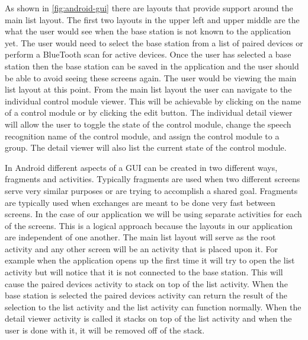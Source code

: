 As shown in \autoref{fig:android-gui} there are layouts that provide support
around the main list layout. The first two layouts in the upper left and upper
middle are the what the user would see when the base station is not known to
the application yet. The user would need to select the base station from a list
of paired devices or perform a BlueTooth scan for active devices. Once the user
has selected a base station then the base station can be saved in the
application and the user should be able to avoid seeing these screens again.
The user would be viewing the main list layout at this point. From the main
list layout the user can navigate to the individual control module viewer. This
will be achievable by clicking on the name of a control module or by clicking
the edit button. The individual detail viewer will allow the user to toggle the
state of the control module, change the speech recognition name of the control
module, and assign the control module to a group. The detail viewer will also
list the current state of the control module.

In Android different aspects of a GUI can be created in two different ways,
fragments and activities. Typically fragments are used when two different
screens serve very similar purposes or are trying to accomplish a shared goal.
Fragments are typically used when exchanges are meant to be done very fast
between screens. In the case of our application we will be using separate
activities for each of the screens. This is a logical approach because the
layouts in our application are independent of one another. The main list layout
will serve as the root activity and any other screen will be an activity that
is placed upon it. For example when the application opens up the first time it
will try to open the list activity but will notice that it is not connected to
the base station. This will cause the paired devices activity to stack on top
of the list activity. When the base station is selected the paired devices
activity can return the result of the selection to the list activity and the
list activity can function normally. When the detail viewer activity is called
it stacks on top of the list activity and when the user is done with it, it
will be removed off of the stack.

